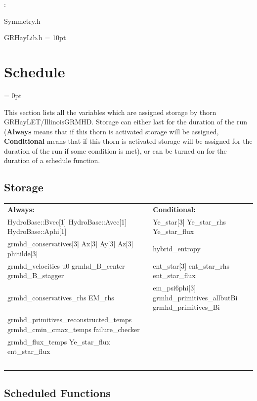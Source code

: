 \documentclass{article}
\begin{document}
\vspace{5mm}

: 

Symmetry.h

GRHayLib.h
\vspace{2mm}\parskip = 10pt 

\section{Schedule} 


\parskip = 0pt


\noindent This section lists all the variables which are assigned storage by thorn GRHayLET/IllinoisGRMHD.  Storage can either last for the duration of the run ({\bf Always} means that if this thorn is activated storage will be assigned, {\bf Conditional} means that if this thorn is activated storage will be assigned for the duration of the run if some condition is met), or can be turned on for the duration of a schedule function.


\subsection*{Storage}

\hspace{5mm}

 \begin{tabular*}{160mm}{ll} 

{\bf Always:}& {\bf Conditional:} \\ 
 HydroBase::Bvec[1] HydroBase::Avec[1] HydroBase::Aphi[1] &  Ye\_star[3] Ye\_star\_rhs Ye\_star\_flux\\ 
 grmhd\_conservatives[3] Ax[3] Ay[3] Az[3] phitilde[3] &  hybrid\_entropy\\ 
 grmhd\_velocities u0 grmhd\_B\_center grmhd\_B\_stagger &  ent\_star[3] ent\_star\_rhs ent\_star\_flux\\ 
 grmhd\_conservatives\_rhs EM\_rhs &  em\_psi6phi[3] grmhd\_primitives\_allbutBi grmhd\_primitives\_Bi\\ 
 grmhd\_primitives\_reconstructed\_temps grmhd\_cmin\_cmax\_temps failure\_checker & ~\\ 
 grmhd\_flux\_temps Ye\_star\_flux ent\_star\_flux & ~\\ 
~ & ~\\ 
\end{tabular*} 


\subsection*{Scheduled Functions}
\vspace{5mm}
\end{document}
